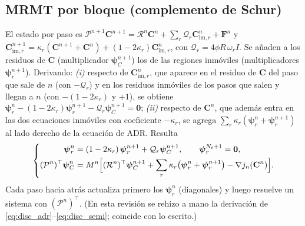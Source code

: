\documentclass[11pt]{article}
\numberwithin{equation}{section}
\theoremstyle{plain}
\theoremstyle{definition}
\theoremstyle{remark}
\newcommand{\im}{\mathrm{im}}
\begin{document}
\subsection{MRMT por bloque (complemento de Schur)}
El estado por paso es $\mathcal{P}^{n+1}\mathbf{C}^{n+1}=\mathcal{R}^{n}\mathbf{C}^n
+\sum_r\mathcal{Q}_r\mathbf{C}_{\im,r}^n+\mathbf{F}^n$ y
$\mathbf{C}_{\im,r}^{n+1}=\kappa_r(\mathbf{C}^{n+1}+\mathbf{C}^n)+(1-2\kappa_r)\mathbf{C}_{\im,r}^n$,
con $\mathcal{Q}_r=4\phi R\,\omega_r I$. Se añaden a los residuos de $\mathbf{C}$
(multiplicador $\boldsymbol\psi_C^{n+1}$) los de las regiones inmóviles (multiplicadores $\boldsymbol\psi_r^{n+1}$). Derivando:
\emph{(i)} respecto de $\mathbf{C}_{\im,r}^n$, que aparece en el residuo de $\mathbf{C}$ del paso que sale de $n$ (con
$-\mathcal{Q}_r$) y en los residuos inmóviles de los pasos que salen y llegan a $n$ (con $-(1-2\kappa_r)$ y $+1$), se obtiene
$\boldsymbol\psi_r^{n}-(1-2\kappa_r)\boldsymbol\psi_r^{n+1}-\mathcal{Q}_r\boldsymbol\psi_C^{n+1}=\mathbf{0}$;
\emph{(ii)} respecto de $\mathbf{C}^n$, que además entra en las dos ecuaciones inmóviles con coeficiente $-\kappa_r$,
se agrega $\sum_r\kappa_r(\boldsymbol\psi_r^{n}+\boldsymbol\psi_r^{n+1})$ al lado derecho de la ecuación de ADR. Resulta
\begin{equation}
\left\{\begin{aligned}
\boldsymbol\psi_r^{n}&=(1-2\kappa_r)\,\boldsymbol\psi_r^{n+1}+\mathcal{Q}_r\boldsymbol\psi_C^{n+1},
\qquad \boldsymbol\psi_r^{N_t+1}=\mathbf{0},\\
(\mathcal{P}^{n})^\top\boldsymbol\psi_C^{n}&=M^n\Bigl[(\mathcal{R}^{n})^\top\boldsymbol\psi_C^{n+1}
+\sum_r\kappa_r\bigl(\boldsymbol\psi_r^{n}+\boldsymbol\psi_r^{n+1}\bigr)-\nabla j_n(\mathbf{C}^n)\Bigr].
\end{aligned}\right.
\label{eq:disc_block}
\end{equation}
Cada paso hacia atrás actualiza primero los $\boldsymbol\psi_r^n$ (diagonales) y luego resuelve un sistema con
$(\mathcal{P}^n)^\top$. (En esta revisión se rehizo a mano la derivación de \eqref{eq:disc_adr}--\eqref{eq:disc_semi}; coincide con lo escrito.)
\end{document}
